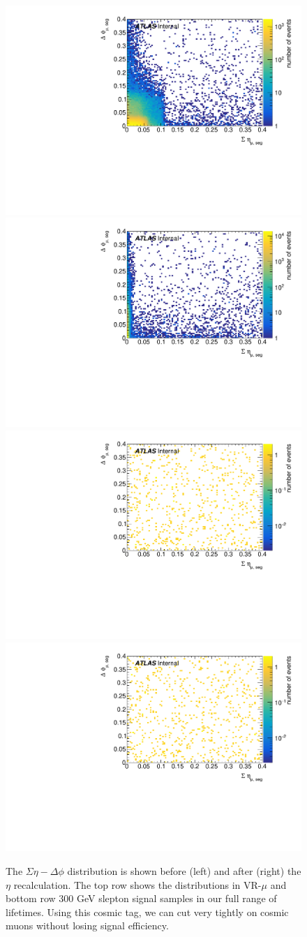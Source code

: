\begin{figure}[htbp]
\centering
\includegraphics[width=.48\textwidth]{figures/cosmics/v4_widetag_2_sumEta_dPhi_min.pdf}
\includegraphics[width=.48\textwidth]{figures/cosmics/v4_widetag_2_sumEta_dPhi_min_corr.pdf}
\includegraphics[width=.48\textwidth]{figures/cosmics/300_slep_2_sumEta_dPhi_min.pdf}
\includegraphics[width=.48\textwidth]{figures/cosmics/300_slep_2_sumEta_dPhi_min_corr.pdf}
\caption{The $\Sigma\eta - \Delta\phi$ distribution is shown before (left) and after (right) the $\eta$ recalculation. The top row shows the distributions in VR-$\mu$ and bottom row 300 GeV slepton signal samples in our full range of lifetimes. Using this cosmic tag, we can cut very tightly on cosmic muons without losing signal efficiency.}
\label{fig:cos_eta_phi}
\end{figure}


